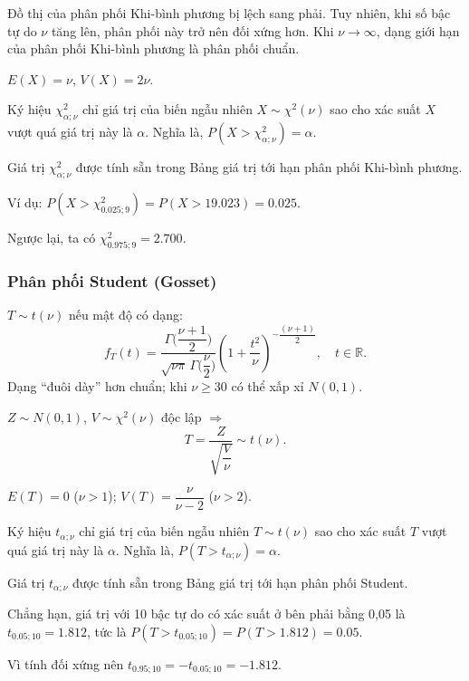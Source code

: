 \documentclass[12pt,a4paper]{article}
\begin{document}
\begin{ynghia}
  Đồ thị của phân phối Khi-bình phương bị lệch sang phải. Tuy nhiên, khi số bậc tự do $\nu$ tăng lên, phân phối này trở nên đối xứng hơn. Khi $\nu \to \infty$, dạng giới hạn của phân phối Khi-bình phương là phân phối chuẩn.
\end{ynghia}

\begin{dinhly}
  $E(X) = \nu$, \quad $V(X) = 2\nu$.
\end{dinhly}

\begin{dinhnghia}[title={Giá trị tới hạn $\chi^2_{\alpha;\nu}$}]
  Ký hiệu $\chi^2_{\alpha;\nu}$ chỉ giá trị của biến ngẫu nhiên $X \sim \chi^2(\nu)$ sao cho xác suất $X$ vượt quá giá trị này là $\alpha$.
  Nghĩa là, $P(X > \chi^2_{\alpha;\nu}) = \alpha$.

  Giá trị $\chi^2_{\alpha;\nu}$ được tính sẵn trong Bảng giá trị tới hạn phân phối Khi-bình phương.

  Ví dụ: $P(X > \chi^2_{0.025;9}) = P(X > 19.023) = 0.025$.

  Ngược lại, ta có $\chi^2_{0.975;9} = 2.700$.
\end{dinhnghia}

\subsubsection{Phân phối Student (Gosset)}

\begin{dinhnghia}
  $T \sim t(\nu)$ nếu mật độ có dạng:
  \[
    f_T(t) = \dfrac{\Gamma\bigl(\dfrac{\nu+1}{2}\bigr)}{\sqrt{\nu\pi}\,\Gamma\bigl(\dfrac{\nu}{2}\bigr)} \left(1 + \dfrac{t^2}{\nu}\right)^{-\dfrac{(\nu+1)}{2}}, \quad t \in \mathbb{R}.
  \]
  Dạng ``đuôi dày'' hơn chuẩn; khi $\nu \ge 30$ có thể xấp xỉ $N(0,1)$.
\end{dinhnghia}

\begin{dinhly}[title={Cấu tạo từ chuẩn và $\chi^2$}]
  $Z \sim N(0,1)$, $V \sim \chi^2(\nu)$ độc lập $\Rightarrow$
  \[
    T = \dfrac{Z}{\sqrt{\dfrac{V}{\nu}}} \sim t(\nu).
  \]
\end{dinhly}

\begin{dinhly}
  $E(T) = 0$ ($\nu > 1$); \quad $V(T) = \dfrac{\nu}{\nu-2}$ ($\nu > 2$).
\end{dinhly}

\begin{dinhnghia}[title={Giá trị tới hạn $t_{\alpha;\nu}$}]
  Ký hiệu $t_{\alpha;\nu}$ chỉ giá trị của biến ngẫu nhiên $T \sim t(\nu)$ sao cho xác suất $T$ vượt quá giá trị này là $\alpha$. Nghĩa là,
  $P(T > t_{\alpha;\nu}) = \alpha$.

  Giá trị $t_{\alpha;\nu}$ được tính sẵn trong Bảng giá trị tới hạn phân phối Student.

  Chẳng hạn, giá trị với 10 bậc tự do có xác suất ở bên phải bằng 0,05 là $t_{0.05;10} = 1.812$, tức là
  $P(T > t_{0.05;10}) = P(T > 1.812) = 0.05$.

  Vì tính đối xứng nên $t_{0.95;10} = -t_{0.05;10} = -1.812$.
\end{dinhnghia}
\end{document}
